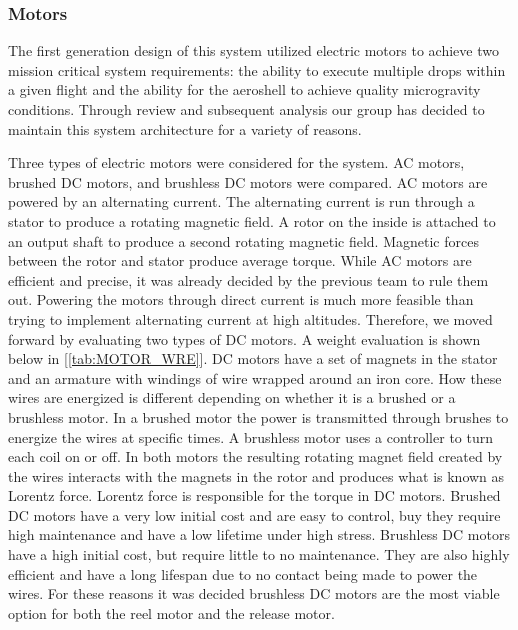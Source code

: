 \subsubsection{Motors}

\indent\indent The first generation design of this system utilized electric motors to achieve two mission critical system requirements: the ability to execute multiple drops within a given flight and the ability for the aeroshell to achieve quality microgravity conditions. Through review and subsequent analysis our group has decided to maintain this system architecture for a variety of reasons. 

\indent\indent Three types of electric motors were considered for the system. AC motors, brushed DC motors, and brushless DC motors were compared. AC motors are powered by an alternating current. The alternating current is run through a stator to produce a rotating magnetic field. A rotor on the inside is attached to an output shaft to produce a second rotating magnetic field. Magnetic forces between the rotor and stator produce average torque. While AC motors are efficient and precise, it was already decided by the previous team to rule them out. Powering the motors through direct current is much more feasible than trying to implement alternating current at high altitudes. Therefore, we moved forward by evaluating two types of DC motors. A weight evaluation is shown below in [\ref{tab:MOTOR_WRE}]. DC motors have a set of magnets in the stator and an armature with windings of wire wrapped around an iron core. How these wires are energized is different depending on whether it is a brushed or a brushless motor. In a brushed motor the power is transmitted through brushes to energize the wires at specific times. A brushless motor uses a controller to turn each coil on or off. In both motors the resulting rotating magnet field created by the wires interacts with the magnets in the rotor and produces what is known as Lorentz force. Lorentz force is responsible for the torque in DC motors. Brushed DC motors have a very low initial cost and are easy to control, buy they require high maintenance and have a low lifetime under high stress. Brushless DC motors have a high initial cost, but require little to no maintenance. They are also highly efficient and have a long lifespan due to no contact being made to power the wires. For these reasons it was decided brushless DC motors are the most viable option for both the reel motor and the release motor.

